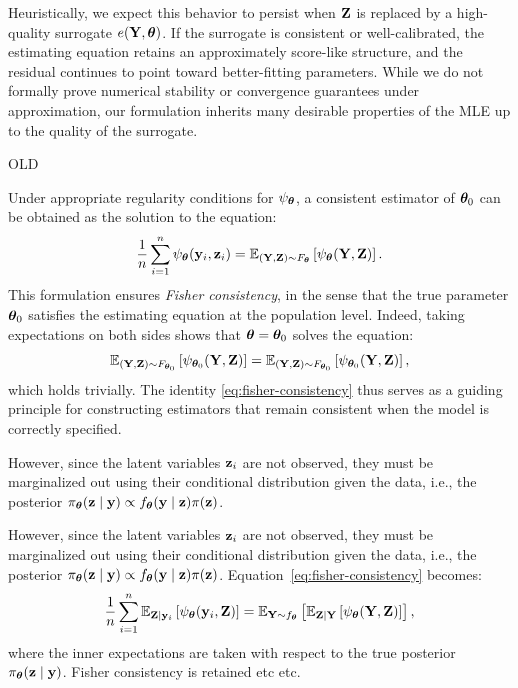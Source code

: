 \documentclass[twoside,11pt]{article}
\begin{document}
Heuristically, we expect this behavior to persist when \( {\bf Z} \) is replaced by a high-quality surrogate \( e({\bf Y}, {\bm{\theta}}) \). If the surrogate is consistent or well-calibrated, the estimating equation retains an approximately score-like structure, and the residual continues to point toward better-fitting parameters. While we do not formally prove numerical stability or convergence guarantees under approximation, our formulation inherits many desirable properties of the MLE up to the quality of the surrogate.





{\color{red} OLD}


Under appropriate regularity conditions for $\psi_{\bm{\theta}}$, a consistent estimator of ${\bm{\theta}}_0$ can be obtained as the solution to the equation:
\begin{equation}
\label{eq:fisher-consistency}
\frac{1}{n} \sum_{i=1}^n \psi_{\bm{\theta}}({\bf y}_i, {\bf z}_i) = \mathbb{E}_{({\bf Y}, {\bf Z}) \sim F_{\bm{\theta}}} \left[ \psi_{\bm{\theta}}({\bf Y}, {\bf Z}) \right].
\end{equation}
This formulation ensures \emph{Fisher consistency}, in the sense that the true parameter ${\bm{\theta}}_0$ satisfies the estimating equation at the population level. Indeed, taking expectations on both sides shows that ${\bm{\theta}} = {\bm{\theta}}_0$ solves the equation:
\[
\mathbb{E}_{({\bf Y}, {\bf Z}) \sim F_{{\bm{\theta}}_0}} \left[ \psi_{{\bm{\theta}}_0}({\bf Y}, {\bf Z}) \right] = \mathbb{E}_{({\bf Y}, {\bf Z}) \sim F_{{\bm{\theta}}_0}} \left[ \psi_{{\bm{\theta}}_0}({\bf Y}, {\bf Z}) \right],
\]
which holds trivially. The identity \eqref{eq:fisher-consistency} thus serves as a guiding principle for constructing estimators that remain consistent when the model is correctly specified.



However, since the latent variables ${\bf z}_i$ are not observed, they must be marginalized out using their conditional distribution given the data, i.e., the posterior $\pi_{\bm{\theta}}({\bf z} \mid {\bf y}) \propto f_{\bm{\theta}}({\bf y} \mid {\bf z})\pi({\bf z})$.

However, since the latent variables ${\bf z}_i$ are not observed, they must be marginalized out using their conditional distribution given the data, i.e., the posterior $\pi_{\bm{\theta}}({\bf z} \mid {\bf y}) \propto f_{\bm{\theta}}({\bf y} \mid {\bf z})\pi({\bf z})$. Equation~\eqref{eq:fisher-consistency} becomes:
\begin{equation}
\label{eq:law-total-expectation}
\frac{1}{n} \sum_{i=1}^n \mathbb{E}_{{\bf Z} \mid {\bf y}_i} \left[ \psi_{\bm{\theta}}({\bf y}_i, {\bf Z}) \right]
=
\mathbb{E}_{{\bf Y} \sim f_{\bm{\theta}}} \left[ \mathbb{E}_{{\bf Z} \mid {\bf Y}} \left[ \psi_{\bm{\theta}}({\bf Y}, {\bf Z}) \right] \right],
\end{equation}
where the inner expectations are taken with respect to the true posterior $\pi_{\bm{\theta}}({\bf z} \mid {\bf y})$. Fisher consistency is retained etc etc.
\end{document}
